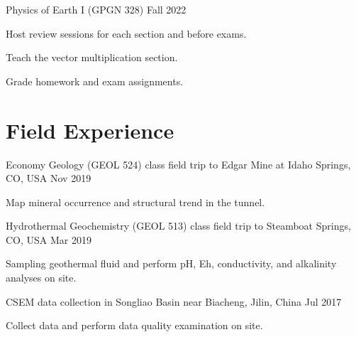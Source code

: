 \documentclass[paper=a4,fontsize=11pt]{scrartcl} %
\newcommand{\sepspace}{\vspace*{0.5em}}		%
\newcommand{\NewPart}[1]{\section*{{#1}}}
\begin{document}
\hspace{0em} Physics of Earth I (GPGN 328)  \hspace{26.9em} Fall 2022

\hspace{0em} \textbullet \hspace{1em} Host review sessions for each section and before exams.

\hspace{0em} \textbullet \hspace{1em} Teach the vector multiplication section.

\hspace{0em} \textbullet \hspace{1em} Grade homework and exam assignments.

\sepspace




\NewPart{Field Experience}{}
\hspace{2em} Economy Geology (GEOL 524) class field trip to Edgar Mine at Idaho Springs, CO, USA \hspace{1.6em} Nov 2019

\hspace{0em} \textbullet \hspace{1em} Map mineral occurrence and structural trend in the tunnel.

\hspace{0em} Hydrothermal Geochemistry (GEOL 513) class field trip to Steamboat Springs, CO, USA \hspace{1.3em} Mar 2019

\hspace{0em} \textbullet \hspace{1em} Sampling geothermal fluid and perform pH, Eh, conductivity, and alkalinity analyses on site.

\hspace{0em} CSEM data collection in Songliao Basin near Biacheng, Jilin, China  \hspace{11.2em} Jul 2017

\hspace{0em} \textbullet \hspace{1em} Collect data and perform data quality examination on site.

\sepspace
\end{document}
